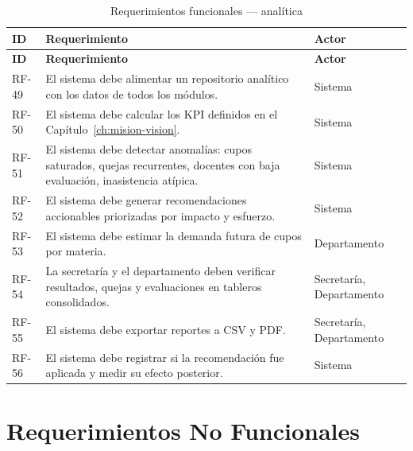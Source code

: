 \begin{longtable}{@{}p{1.5cm} p{6.5cm} p{4.5cm}@{}}
\caption{Requerimientos funcionales --- analítica}
\label{tab:rf-analitica}\\
\toprule
\rowcolor{azulClaro}
\textbf{ID} & \textbf{Requerimiento} & \textbf{Actor} \\
\midrule
\endfirsthead
\toprule
\rowcolor{azulClaro}
\textbf{ID} & \textbf{Requerimiento} & \textbf{Actor} \\
\midrule
\endhead
RF-49 & El sistema debe alimentar un repositorio analítico con los datos de todos los módulos. & Sistema \\
RF-50 & El sistema debe calcular los \ac{KPI} definidos en el Capítulo~\ref{ch:mision-vision}. & Sistema \\
RF-51 & El sistema debe detectar anomalías: cupos saturados, quejas recurrentes, docentes con baja evaluación, inasistencia atípica. & Sistema \\
RF-52 & El sistema debe generar recomendaciones accionables priorizadas por impacto y esfuerzo. & Sistema \\
RF-53 & El sistema debe estimar la demanda futura de cupos por materia. & Departamento \\
RF-54 & La secretaría y el departamento deben verificar resultados, quejas y evaluaciones en tableros consolidados. & Secretaría, Departamento \\
RF-55 & El sistema debe exportar reportes a \ac{CSV} y \ac{PDF}. & Secretaría, Departamento \\
RF-56 & El sistema debe registrar si la recomendación fue aplicada y medir su efecto posterior. & Sistema \\
\bottomrule
\end{longtable}

\section{Requerimientos No Funcionales}

